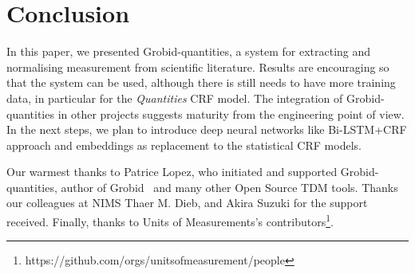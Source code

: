 \documentclass[sigconf]{acmart}
\begin{document}
\section{Conclusion}
\label{sec:conclusion}
In this paper, we presented Grobid-quantities, a system for extracting and normalising measurement from scientific literature. Results are encouraging so that the system can be used, although there is still needs to have more training data, in particular for the \textit{Quantities} CRF model. The integration of Grobid-quantities in other projects suggests maturity from the engineering point of view. In the next steps, we plan to introduce deep neural networks like Bi-LSTM+CRF approach and embeddings as replacement to the statistical CRF models. 

\begin{acks}
Our warmest thanks to Patrice Lopez, who initiated and supported Grobid-quantities, author of Grobid~\cite{GROBID} and many other Open Source TDM tools. Thanks our colleagues at NIMS Thaer M. Dieb, and Akira Suzuki for the support received. Finally, thanks to Units of Measurements's contributors\footnote{https://github.com/orgs/unitsofmeasurement/people}.
\end{acks}




\end{document}
